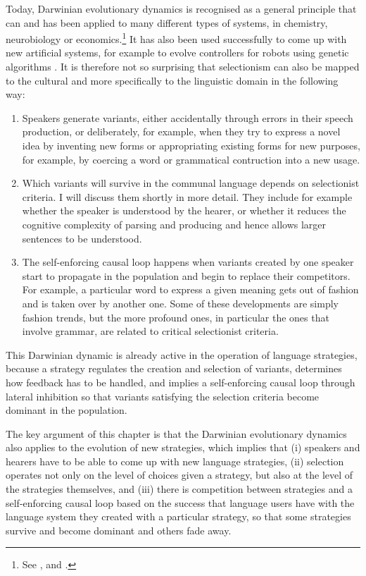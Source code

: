 Today, Darwinian evolutionary dynamics 
is recognised as a general principle that can and has been applied to 
many different types of systems, in chemistry, neurobiology or 
economics.\footnote{See \cite{Arthur:1996}, \cite{Edelman:1987} and \cite{Luisi:2001}.}
It has also been used successfully to come up 
with new artificial systems, for example to evolve controllers for robots using 
genetic algorithms \citep{Nolfi:2000}. It is therefore not so surprising that 
selectionism can also be mapped to the cultural and more specifically to the linguistic domain in the following way: 
\begin{enumerate}
\item Speakers generate variants, either accidentally through errors in their speech production, or deliberately, 
for example, when they try to express a novel idea by inventing new forms or 
appropriating existing forms for new purposes, for example, by coercing a word or grammatical contruction into a new usage. 
\item Which variants will survive in the communal language depends on selectionist criteria. I will 
discuss them shortly in more detail. They include for example whether the speaker is understood by the hearer, or whether 
it reduces the cognitive complexity of parsing and producing and hence allows larger sentences to be understood. 
\item The self-enforcing causal loop happens when variants created by one speaker start to propagate in the population 
and begin to replace their competitors. For example, a particular word to express a given meaning gets out of fashion 
and is taken over by another one. Some of these developments are simply fashion trends, but the more profound ones, 
in particular the ones that involve grammar, are related to critical selectionist criteria. 
\end{enumerate}
This Darwinian dynamic is already active in the operation of language strategies, because a strategy regulates the 
creation and selection of variants, determines how feedback has to be handled, and implies a self-enforcing causal loop through 
lateral inhibition so that variants satisfying the selection criteria become 
dominant in the population. 

The key argument of this chapter is that the Darwinian evolutionary dynamics
also applies to the evolution of new strategies, which implies that (i) speakers and 
hearers have to be able to come up with new language strategies, (ii) selection operates not only on the level of choices given 
a strategy, but also at the level of the strategies themselves, and (iii) there is competition between strategies 
and a self-enforcing causal loop based on the success that language users have with the language system they created 
with a particular strategy, so that some strategies survive and become dominant and others fade away. 

